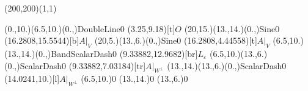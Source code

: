 \unitlength=1bp%

\begin{feynartspicture}(200,200)(1,1)

\FADiagram{}
\FAProp(0.,10.)(6.5,10.)(0.,){DoubleLine}{0}
\FALabel(3.25,9.18)[t]{$O$}
\FAProp(20,15.)(13.,14.)(0.,){Sine}{0}
\FALabel(16.2808,15.5544)[b]{$A|_V$}
\FAProp(20,5.)(13.,6.)(0.,){Sine}{0}
\FALabel(16.2808,4.44558)[t]{$A|_V$}
\FAProp(6.5,10.)(13.,14.)(0.,){BandScalarDash}{0}
\FALabel(9.33882,12.9682)[br]{$L_\varepsilon$}
\FAProp(6.5,10.)(13.,6.)(0.,){ScalarDash}{0}
\FALabel(9.33882,7.03184)[tr]{$A|_{W^\perp}$}
\FAProp(13.,14.)(13.,6.)(0.,){ScalarDash}{0}
\FALabel(14.0241,10.)[l]{$A|_{W^\perp}$}
\FAVert(6.5,10.){0}
\FAVert(13.,14.){0}
\FAVert(13.,6.){0}
\end{feynartspicture}

